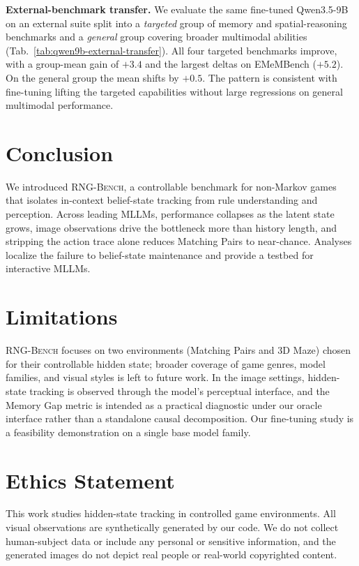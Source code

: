 \documentclass{llmxive}
\providecommand{\benchname}{\textsc{RNG-Bench}\xspace}
\providecommand{\paragraph}[1]{\vspace{1mm}\noindent\textbf{#1}}
\begin{document}
\paragraph{External-benchmark transfer.}
We evaluate the same fine-tuned Qwen3.5-9B on an external suite split into a \emph{targeted} group of memory and spatial-reasoning benchmarks and a \emph{general} group covering broader multimodal abilities (Tab.~\ref{tab:qwen9b-external-transfer}). All four targeted benchmarks improve, with a group-mean gain of $+3.4$ and the largest deltas on EMeMBench ($+5.2$). On the general group the mean shifts by $+0.5$. The pattern is consistent with fine-tuning lifting the targeted capabilities without large regressions on general multimodal performance.
\section{Conclusion}
\label{sec:conclusion}

We introduced \benchname{}, a controllable benchmark for non-Markov games that isolates in-context belief-state tracking from rule understanding and perception. Across leading MLLMs, performance collapses as the latent state grows, image observations drive the bottleneck more than history length, and stripping the action trace alone reduces Matching Pairs to near-chance. Analyses localize the failure to belief-state maintenance and provide a testbed for interactive MLLMs.

\section*{Limitations}
\benchname{} focuses on two environments (Matching Pairs and 3D Maze) chosen for their controllable hidden state; broader coverage of game genres, model families, and visual styles is left to future work. In the image settings, hidden-state tracking is observed through the model's perceptual interface, and the Memory Gap metric is intended as a practical diagnostic under our oracle interface rather than a standalone causal decomposition. Our fine-tuning study is a feasibility demonstration on a single base model family.

\section*{Ethics Statement}
This work studies hidden-state tracking in controlled game environments. All visual observations are synthetically generated by our code. We do not collect human-subject data or include any personal or sensitive information, and the generated images do not depict real people or real-world copyrighted content.
\end{document}
